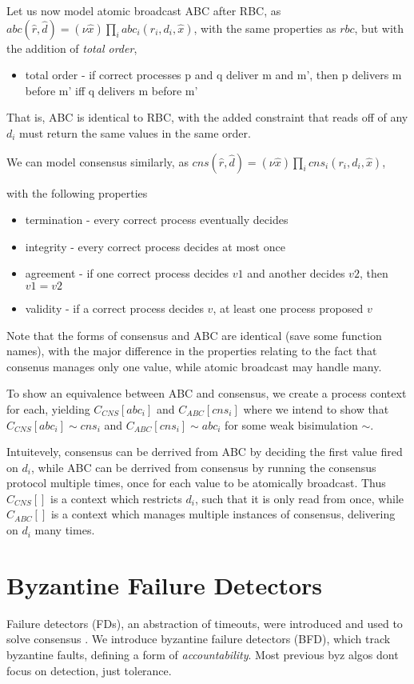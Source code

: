 Let us now model atomic broadcast ABC after RBC, as 
$abc(\hat{r}, \hat{d}) = (\nu \hat{x}) \prod_i abc_i(r_i, d_i, \hat{x})$,
with the same properties as $rbc$, but with the addition of \emph{total order},
\begin{itemize}
\item total order - if correct processes p and q deliver m and m', then p delivers m before m' iff q delivers m before m'
\end{itemize}


That is, ABC is identical to RBC, with the added constraint that reads off of any $d_i$ 
must return the same values in the same order.

We can model consensus similarly, as 
$cns(\hat{r}, \hat{d}) = (\nu \hat{x}) \prod_i cns_i(r_i, d_i, \hat{x})$,

with the following properties

\begin{itemize}
\item termination - every correct process eventually decides
\item integrity - every correct process decides at most once
\item agreement - if one correct process decides $v1$ and another decides $v2$, then $v1=v2$
\item validity - if a correct process decides $v$, at least one process proposed $v$
\end{itemize}

Note that the forms of consensus and ABC are identical (save some function names),
with the major difference in the properties relating to the fact that consenus
manages only one value, while atomic broadcast may handle many.

To show an equivalence between ABC and consensus,
we create a process context for each,
yielding $ C_{CNS}[ abc_i ] $ and $ C_{ABC}[ cns_i ] $ 
where we intend to show that 
$ C_{CNS}[ abc_i ] \sim cns_i $ and $ C_{ABC}[ cns_i ] \sim abc_i $ for
some weak bisimulation $\sim$.

Intuitevely, consensus can be derrived from ABC by deciding the first value fired on $d_i$,
while ABC can be derrived from consensus by running the consensus protocol multiple times,
once for each value to be atomically broadcast.
Thus $ C_{CNS}[ ] $ is a context which restricts $d_i$, such that it is only read from once,
while $ C_{ABC}[ ] $ is a context which manages multiple instances of consensus, delivering on $d_i$ many times.


\section{Byzantine Failure Detectors}
Failure detectors (FDs), an abstraction of timeouts,
were introduced and used to solve consensus \cite{chandra1996unreliable}.
We introduce byzantine failure detectors (BFD), which track byzantine faults,
defining a form of \emph{accountability}.
Most previous byz algos dont focus on detection, just tolerance.

